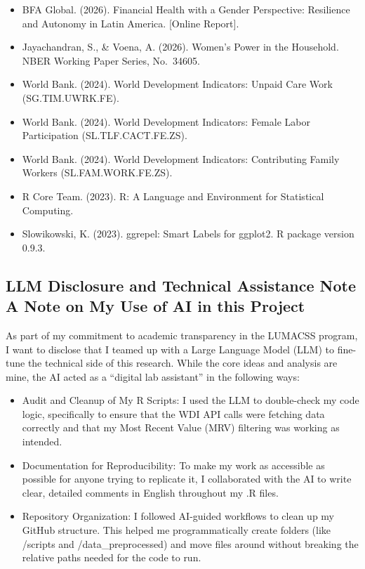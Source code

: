 \documentclass[
  letterpaper,
  DIV=11,
  numbers=noendperiod]{scrartcl}
\begin{document}
\begin{itemize}
\item
  BFA Global. (2026). Financial Health with a Gender Perspective:
  Resilience and Autonomy in Latin America. {[}Online Report{]}.
\item
  Jayachandran, S., \& Voena, A. (2026). Women's Power in the Household.
  NBER Working Paper Series, No.~34605.
\item
  World Bank. (2024). World Development Indicators: Unpaid Care Work
  (SG.TIM.UWRK.FE).
\item
  World Bank. (2024). World Development Indicators: Female Labor
  Participation (SL.TLF.CACT.FE.ZS).
\item
  World Bank. (2024). World Development Indicators: Contributing Family
  Workers (SL.FAM.WORK.FE.ZS).
\item
  R Core Team. (2023). R: A Language and Environment for Statistical
  Computing.
\item
  Slowikowski, K. (2023). ggrepel: Smart Labels for ggplot2. R package
  version 0.9.3.
\end{itemize}

\subsection{LLM Disclosure and Technical Assistance Note A Note on My
Use of AI in this
Project}\label{llm-disclosure-and-technical-assistance-note-a-note-on-my-use-of-ai-in-this-project}

As part of my commitment to academic transparency in the LUMACSS
program, I want to disclose that I teamed up with a Large Language Model
(LLM) to fine-tune the technical side of this research. While the core
ideas and analysis are mine, the AI acted as a ``digital lab assistant''
in the following ways:

\begin{itemize}
\item
  Audit and Cleanup of My R Scripts: I used the LLM to double-check my
  code logic, specifically to ensure that the WDI API calls were
  fetching data correctly and that my Most Recent Value (MRV) filtering
  was working as intended.
\item
  Documentation for Reproducibility: To make my work as accessible as
  possible for anyone trying to replicate it, I collaborated with the AI
  to write clear, detailed comments in English throughout my .R files.
\item
  Repository Organization: I followed AI-guided workflows to clean up my
  GitHub structure. This helped me programmatically create folders (like
  /scripts and /data\_preprocessed) and move files around without
  breaking the relative paths needed for the code to run.
\end{itemize}
\end{document}
